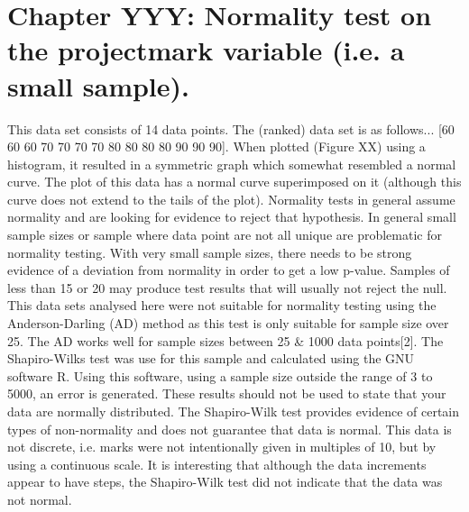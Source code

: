 \documentclass[12pt,twoside]{article}
\begin{document}
\section[Chapter YYY: Normality test on the projectmark variable (i.e. a
small sample). ]{\rmfamily Chapter YYY: Normality test on the
projectmark variable (i.e. a small sample). }
This data set consists of 14 data points. The (ranked) data set is as
follows... [60 60 60 70 70 70 70 80 80 80 80 90 90 90]. When plotted
(Figure XX) using a histogram, it resulted in a symmetric graph which
somewhat resembled a normal curve. The plot of this data has a normal
curve superimposed on it (although this curve does not extend to the
tails of the plot).\newline
\newline
Normality tests in general assume normality and are looking for evidence
to reject that hypothesis. In general small sample sizes or sample
where data point are not all unique are problematic for normality
testing. With very small sample sizes, there needs to be strong
evidence of a deviation from normality in order to get a low p{}-value.
Samples of less than 15 or 20 may produce test results that will
usually not reject the null.\newline
\newline
This data sets analysed here were not suitable for normality testing
using the Anderson{}-Darling (AD) method as this test is only suitable
for sample size over 25. The AD works well for sample sizes between 25
\& 1000 data points[2].\newline
\newline
The Shapiro{}-Wilks test was use for this sample and calculated using
the GNU software R. Using this software, using a sample size outside
the range of 3 to 5000, an error is generated.\newline
{}\newline
\newline
These results should not be used to state that your data are
{\textquotedbl}normally distributed{\textquotedbl}. The Shapiro{}-Wilk
test provides evidence of certain types of
{\textquotedbl}non{}-normality{\textquotedbl} and does not guarantee
that data is normal.\newline
\newline
This data is not discrete, i.e. marks were not intentionally given in
multiples of 10, but by using a continuous scale. It is interesting
that although the data increments appear to have steps, the
Shapiro{}-Wilk test did not indicate that the data was not normal.
\end{document}
